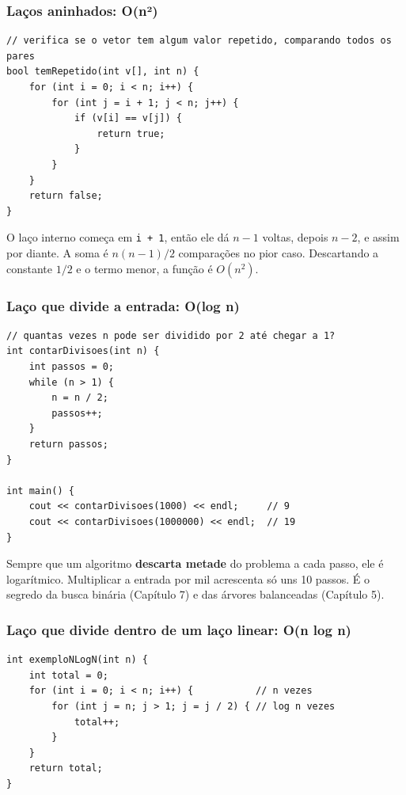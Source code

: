 \subsubsection{Laços aninhados: O(n²)}

\begin{codigo}
\begin{Verbatim}[breaklines=true, breaksymbolleft={}, fontsize=\footnotesize]
// verifica se o vetor tem algum valor repetido, comparando todos os pares
bool temRepetido(int v[], int n) {
    for (int i = 0; i < n; i++) {
        for (int j = i + 1; j < n; j++) {
            if (v[i] == v[j]) {
                return true;
            }
        }
    }
    return false;
}
\end{Verbatim}
\end{codigo}

O laço interno começa em \texttt{i + 1}, então ele dá $n-1$ voltas, depois $n-2$, e assim por diante. A soma é $n(n-1)/2$ comparações no pior caso. Descartando a constante $1/2$ e o termo menor, a função é $O(n^2)$.

\subsubsection{Laço que divide a entrada: O(log n)}

\begin{codigo}
\begin{Verbatim}[breaklines=true, breaksymbolleft={}, fontsize=\footnotesize]
// quantas vezes n pode ser dividido por 2 até chegar a 1?
int contarDivisoes(int n) {
    int passos = 0;
    while (n > 1) {
        n = n / 2;
        passos++;
    }
    return passos;
}

int main() {
    cout << contarDivisoes(1000) << endl;     // 9
    cout << contarDivisoes(1000000) << endl;  // 19
}
\end{Verbatim}
\end{codigo}

Sempre que um algoritmo \textbf{descarta metade} do problema a cada passo, ele é logarítmico. Multiplicar a entrada por mil acrescenta só uns 10 passos. É o segredo da busca binária (Capítulo 7) e das árvores balanceadas (Capítulo 5).

\subsubsection{Laço que divide dentro de um laço linear: O(n log n)}

\begin{codigo}
\begin{Verbatim}[breaklines=true, breaksymbolleft={}, fontsize=\footnotesize]
int exemploNLogN(int n) {
    int total = 0;
    for (int i = 0; i < n; i++) {           // n vezes
        for (int j = n; j > 1; j = j / 2) { // log n vezes
            total++;
        }
    }
    return total;
}
\end{Verbatim}
\end{codigo}

